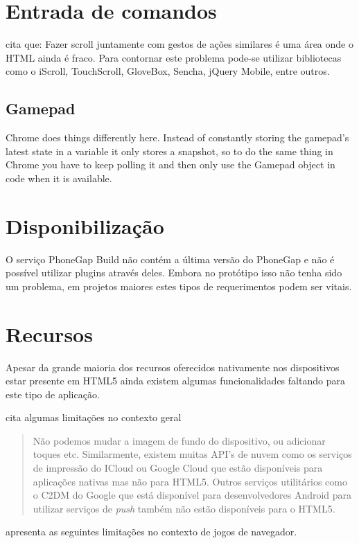 \section{Entrada de comandos}

\autocite[pp. 9]{aSeriousContender} cita que: Fazer scroll juntamente
com gestos de ações similares é uma área onde o HTML ainda é
fraco. Para contornar este problema pode-se utilizar bibliotecas como o
iScroll, TouchScroll, GloveBox, Sencha, jQuery Mobile, entre outros.

\subsection{Gamepad}
Chrome does things differently here. Instead of constantly storing the gamepad's latest state in a variable it only stores a snapshot, so to do the same thing in Chrome you have to keep polling it and then only use the Gamepad object in code when it is available.

\section{Disponibilização}

O serviço PhoneGap Build não contém a última versão do PhoneGap e
não é possível utilizar plugins através deles. Embora no protótipo
isso não tenha sido um problema, em projetos maiores estes tipos de
requerimentos podem ser vitais.

\section{Recursos}
Apesar da grande maioria dos recursos oferecidos nativamente
nos dispositivos estar presente em HTML5 ainda existem algumas
funcionalidades faltando para este tipo de aplicação.

\cite{html5Tradeoffs} cita algumas limitações no contexto geral
\begin{quote}
Não podemos mudar a imagem de fundo do dispositivo, ou adicionar toques
etc. Similarmente, existem muitas API's de nuvem como os serviços
de impressão do ICloud ou Google Cloud que estão disponíveis para
aplicações nativas mas não para HTML5. Outros serviços utilitários
como o C2DM do Google que está disponível para desenvolvedores Android
para utilizar serviços de \textit{push} também não estão disponíveis
para o HTML5.
\end{quote}

\cite{browserGamesTechnologyAndFuture} apresenta as seguintes limitações
no contexto de jogos de navegador.

